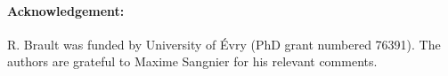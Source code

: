 \documentclass{article}
\begin{document}

\paragraph{Acknowledgement:}
R. Brault was funded by  University of \'Evry (PhD grant numbered 76391). The
authors are grateful to Maxime Sangnier for his relevant comments.
% 
% 

\end{document}
